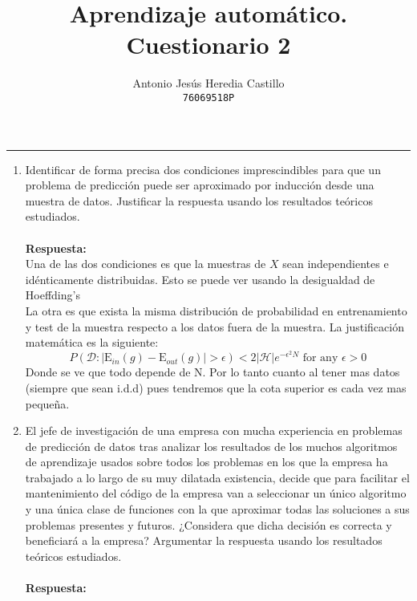 \documentclass[12pt,a4paper]{article}
\newcommand{\horrule}[1]{\rule{\linewidth}{#1}} %
\begin{document}
\title{Aprendizaje autom\'atico. Cuestionario 2}

\author{
  Antonio Jesús Heredia Castillo\\
  \texttt{76069518P}
}

\date{}
\maketitle
\horrule{2pt}

\begin{enumerate}
	\item Identificar de forma precisa dos condiciones imprescindibles para que un problema de predicción puede ser aproximado por inducción desde una muestra de datos. Justificar la respuesta usando los resultados teóricos estudiados.\\\\
	\textbf{Respuesta: }\\
	Una de las dos condiciones es que la muestras de $X$ sean independientes e idénticamente distribuidas. Esto se puede ver usando la desigualdad de Hoeffding's
	\\La otra es que exista la misma distribución de probabilidad en entrenamiento y test de la muestra respecto a los datos fuera de la muestra.
	La justificación matemática es la siguiente:
	$$
	P\left(\mathcal{D} :\left|\mathrm{E}_{i n}(g)-\mathrm{E}_{o u t}(g)\right|>\epsilon\right)<2|\mathcal{H}| e^{-\epsilon^{2} N} \text { for any } \epsilon>0
	$$
	Donde se ve que todo depende de N. Por lo tanto cuanto al tener mas datos (siempre que sean i.d.d) pues tendremos que la cota superior es cada vez mas pequeña. 
	\item  El jefe de investigación de una empresa con mucha experiencia en problemas de predicción de datos tras analizar los resultados de los muchos algoritmos de aprendizaje usados sobre todos los problemas en los que la empresa ha trabajado a lo largo de su muy dilatada existencia, decide que para facilitar el mantenimiento del código de la empresa van a seleccionar un único algoritmo y una única clase de funciones con la que aproximar todas las soluciones a sus problemas presentes y futuros. ¿Considera que dicha decisión es correcta y beneficiará	a la empresa? Argumentar la respuesta usando los resultados teóricos estudiados.\\\\
	\textbf{Respuesta: }\\

\end{enumerate}
\end{document}
